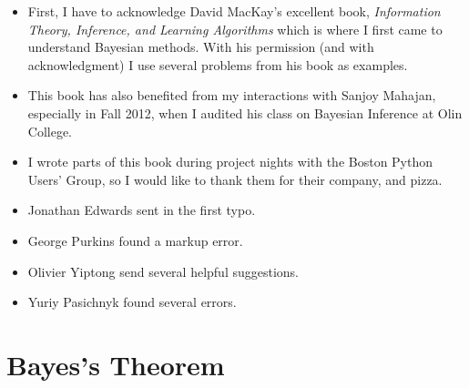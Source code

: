 \documentclass[12pt]{book}
\begin{document}
\begin{itemize}

\item First, I have to acknowledge David MacKay's excellent book,
  {\it Information Theory, Inference, and Learning Algorithms} which is
  where I first came to understand Bayesian methods.  With his
  permission (and with acknowledgment) I use several problems from
  his book as examples.

\item This book has also benefited from my interactions with Sanjoy
  Mahajan, especially in Fall 2012, when I audited his class on
  Bayesian Inference at Olin College.

\item I wrote parts of this book during project nights with the
Boston Python Users' Group, so I would like to thank them for their
company, and pizza.

\item Jonathan Edwards sent in the first typo.

\item George Purkins found a markup error.

\item Olivier Yiptong send several helpful suggestions.

\item Yuriy Pasichnyk found several errors.


\end{itemize}

\normalsize

\clearemptydoublepage

\begin{latexonly}

\tableofcontents

\clearemptydoublepage

\end{latexonly}

\mainmatter

\newcommand{\p}[1]{\ensuremath{\mathrm{p}(#1)}}
\renewcommand{\o}[1]{\ensuremath{\mathrm{o}(#1)}}
\newcommand{\T}[1]{\mbox{#1}}
\newcommand{\AND}{~\mathrm{and}~}
\newcommand{\NOT}{\mathrm{not}~}


\chapter{Bayes's Theorem}
\label{intro}
\end{document}
